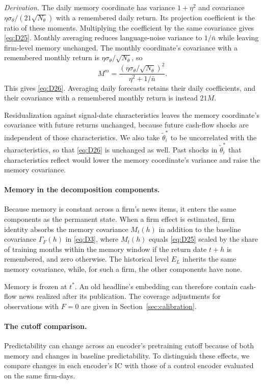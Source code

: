 \documentclass[11pt,letterpaper]{article}
\theoremstyle{remark}
\begin{document}
\emph{Derivation.}
The daily memory coordinate has variance $1+\eta^2$ and covariance $\eta\sigma_\theta/(21\sqrt{N_\theta})$ with a remembered daily return. Its projection coefficient is the ratio of these moments. Multiplying the coefficient by the same covariance gives \eqref{eq:D25}. Monthly averaging reduces language-noise variance to $1/\bar n$ while leaving firm-level memory unchanged. The monthly coordinate's covariance with a remembered monthly return is $\eta\sigma_\theta/\sqrt{N_\theta}$, so
\[
M^m
=\frac{(\eta\sigma_\theta/\sqrt{N_\theta})^2}
{\eta^2+1/\bar n}.
\]
This gives \eqref{eq:D26}. Averaging daily forecasts retains their daily coefficients, and their covariance with a remembered monthly return is instead $21M$.

Residualization against signal-date characteristics leaves the memory coordinate's covariance with future returns unchanged, because future cash-flow shocks are independent of those characteristics. We also take $\tilde\theta_i^\ast$ to be uncorrelated with the characteristics, so that \eqref{eq:D26} is unchanged as well. Past shocks in $\tilde\theta_i^\ast$ that characteristics reflect would lower the memory coordinate's variance and raise the memory covariance.

\paragraph{Memory in the decomposition components.}
Because memory is constant across a firm's news items, it enters the same components as the permanent state. When a firm effect is estimated, firm identity absorbs the memory covariance $M_t(h)$ in addition to the baseline covariance $\Gamma_F(h)$ in \eqref{eq:D3}, where $M_t(h)$ equals \eqref{eq:D25} scaled by the share of training months within the memory window if the return date $t+h$ is remembered, and zero otherwise. The historical level $E_L$ inherits the same memory covariance, while, for such a firm, the other components have none.

Memory is frozen at $t^\ast$. An old headline's embedding can therefore contain cash-flow news realized after its publication. The coverage adjustments for observations with $F=0$ are given in Section~\ref{sec:calibration}.

\paragraph{The cutoff comparison.}
Predictability can change across an encoder's pretraining cutoff because of both memory and changes in baseline predictability. To distinguish these effects, we compare changes in each encoder's IC with those of a control encoder evaluated on the same firm-days.
\end{document}
